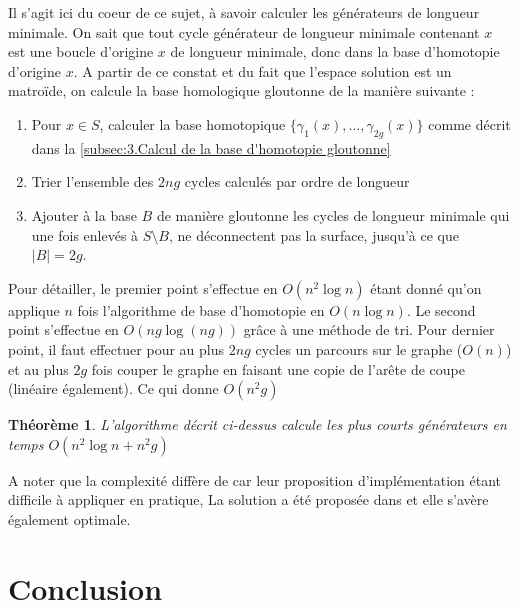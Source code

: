 \documentclass[french]{article}
\newtheorem{thm}{Théorème}[section]
\begin{document}
Il s'agit ici du coeur de ce sujet, à savoir calculer les générateurs de longueur minimale. 
On sait que tout cycle générateur de longueur minimale contenant $x$ est une boucle d'origine $x$ de longueur minimale, 
donc dans la base d'homotopie d'origine $x$. A partir de ce constat et du fait que l'espace solution est un matroïde, on calcule la base homologique gloutonne de la manière suivante :

\begin{enumerate}
    \item Pour $x \in S$, calculer la base homotopique $\{\gamma_1(x), ..., \gamma_{2g}(x)\}$ comme décrit dans la \autoref{subsec:3.Calcul de la base d'homotopie gloutonne}
    \item Trier l'ensemble des $2ng$ cycles calculés par ordre de longueur
    \item Ajouter à la base $B$ de manière gloutonne les cycles de longueur minimale qui une fois enlevés à $S \setminus B$, ne déconnectent pas la surface, jusqu'à ce que $|B|=2g$.
\end{enumerate}

\noindent Pour détailler, le premier point s'effectue en $O(n^2 \log n)$ étant donné qu'on applique $n$ fois l'algorithme de base d'homotopie en $O(n \log n)$.
Le second point s'effectue en $O(ng \log(ng))$ grâce à une méthode de tri. Pour dernier point, il faut effectuer pour au plus $2ng$ cycles un parcours sur le graphe ($O(n)$) 
et au plus $2g$ fois couper le graphe en faisant une copie de l'arête de coupe (linéaire également). Ce qui donne $O(n^2g)$

\begin{thm}
    L'algorithme décrit ci-dessus calcule les plus courts générateurs en temps $O(n^2 \log n + n^2g)$
\end{thm}

A noter que la complexité diffère de \cite{erickson_whittlesey} car leur proposition d'implémentation étant difficile à appliquer en pratique, 
La solution a été proposée dans \cite{implementation} et elle s'avère également optimale.

\section{Conclusion}
\end{document}
